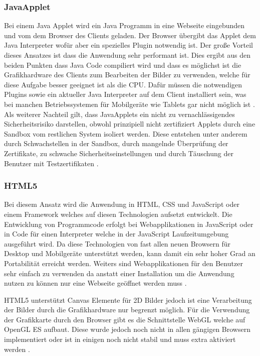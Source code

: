\subsubsection{JavaApplet}
\label{sec:JavaApplet}
Bei einem Java Applet \cite{japp} wird ein Java Programm in eine Webseite eingebunden und vom dem Browser des Clients geladen.
Der Browser übergibt das Applet dem Java Interpreter wofür aber ein spezielles Plugin notwendig ist. 
%
Der große Vorteil dieses Ansatzes ist dass die Anwendung sehr performant ist.
Dies ergibt aus den beiden Punkten dass Java Code compiliert wird und dass es möglichst ist die Grafikhardware des Clients zum Bearbeiten der Bilder zu verwenden,
welche für diese Aufgabe besser geeignet ist als die CPU.
%
Dafür müssen die notwendigen Plugins sowie ein aktueller Java Interpreter auf dem Client installiert sein, 
was bei manchen Betriebssystemen für Mobilgeräte wie Tablets gar nicht möglich ist \cite{japp}. 
Als weiterer Nachteil gilt, dass JavaApplets ein nicht zu vernachlässigendes Sicherheitsrisiko darstellen,
obwohl prinzipiell nicht zertifiziert Applets durch eine Sandbox vom restlichen System isoliert werden.
Diese entstehen unter anderem durch Schwachstellen in der Sandbox, durch mangelnde Überprüfung der Zertifikate, 
zu schwache Sicherheitseinstellungen und durch Täuschung der Benutzer mit Testzertifikaten \cite{java_risks_cisico} \cite{java_risks_bmi}. 


\subsubsection{HTML5}
\label{sec:HTML5}
Bei diesem Ansatz wird die Anwendung in HTML, CSS und JavaScript oder einem Framework welches auf diesen Technologien aufsetzt entwickelt.
Die Entwicklung von Programmcode erfolgt bei Webapplikationen in JavaScript oder in Code für einen Interpreter welche in der JavaScript Laufzeitumgebung ausgeführt wird.
Da diese Technologien von fast allen neuen Browsern für Desktop und Mobilgeräte unterstützt werden, kann damit ein sehr hoher Grad an Portabilität erreicht werden.
Weiters sind Webapplikationen für den Benutzer sehr einfach zu verwenden da anstatt einer Installation um die Anwendung nutzen zu können nur eine Webseite geöffnet werden muss \cite{html}.

HTML5 \cite{html} unterstützt Canvas Elemente für 2D Bilder jedoch ist eine Verarbeitung der Bilder durch die Grafikhardware nur begrenzt möglich.
Für die Verwendung der Grafikkarte durch den Browser gibt es die Schnittstelle WebGL \cite{webgl-14} welche auf OpenGL ES \cite{opengl-es-sepc} aufbaut.
Diese wurde jedoch noch nicht in allen gängigen Browsern implementiert oder ist in einigen noch nicht stabil und muss extra aktiviert werden \cite{webgl-14}.


